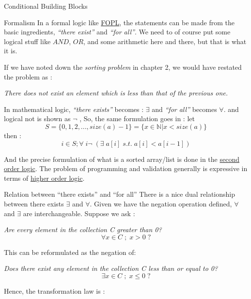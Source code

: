 \begin{section}{Conditional Building Blocks}

\begin{subsection}{Formalism}
In a formal logic like \href{https://en.wikipedia.org/wiki/First-order\_logic}{FOPL}, 
the statements can be made from the basic ingredients, 
\emph{``there exist''} and \emph{``for all''}. We need to of course put some logical stuff like $AND$, $OR$,
and some arithmetic here and there, but that is what it is.

If we have noted down the \emph{sorting problem} in chapter 2, we would have restated the problem as :

\begin{center}
\emph{ There does not exist an element which is less than that of the previous one. }
\end{center} 

In mathematical logic, \emph{``there exists''} becomes : $\exists$ and \emph{``for all''} becomes $\forall$.
and logical not is shown as $\neg$ ,  So, the same formulation goes in : let 
$$
S = \{ 0, 1, 2, ... , size(a)-1  \} =  \{  x \in \mathbb{N} | x < size(a) \} 
$$
then :
$$
  i \in S ; \forall \; i  \neg \; ( \exists \; a[i] \; s.t. \; a[i] < a[i-1]    ) 
$$ 

And the precise formulation of what is a sorted array/list is done in the 
\href{https://en.wikipedia.org/wiki/Second-order_logic}{second order logic}.
The problem of programming and validation generally is expressive in terms of 
\href{https://en.wikipedia.org/wiki/Higher-order_logic}{higher order logic}.
\end{subsection}
\begin{subsection}{Relation between ``there exists'' and ``for all'' }
There is a nice dual relationship between there exists $\exists$ and $\forall$.
Given we have the negation operation defined, $\forall$ and $\exists$  are interchangeable.
Suppose we ask :  
\begin{center}
\emph{ Are every element in the collection C greater than 0? }
$$
\forall x \in C \; ; \; x > 0 \; ?
$$
\end{center}
This can be reformulated as the negation of:
\begin{center}
\emph{ Does there exist any element in the collection C less than or equal to 0? }
$$
\exists x \in C \; ; \; x \le 0 \; ?
$$
\end{center}
Hence, the transformation law is :


\end{subsection}
\end{section}
